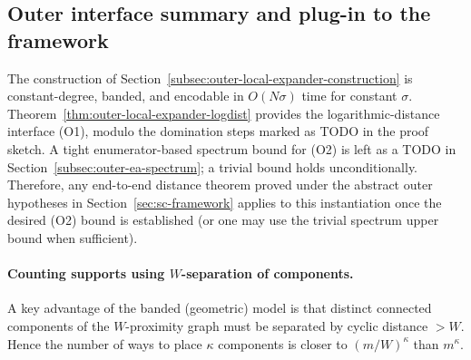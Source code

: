 \subsection{Outer interface summary and plug-in to the framework}
\label{subsec:outer-local-expander-plug}

The construction of Section~\ref{subsec:outer-local-expander-construction} is constant-degree, banded, and encodable in
$O(N\sigma)$ time for constant $\sigma$.
Theorem~\ref{thm:outer-local-expander-logdist} provides the logarithmic-distance interface (O1), modulo the domination
steps marked as TODO in the proof sketch.
A tight enumerator-based spectrum bound for (O2) is left as a TODO in
Section~\ref{subsec:outer-ea-spectrum}; a trivial bound holds unconditionally.
Therefore, any end-to-end distance theorem proved under the abstract outer hypotheses in
Section~\ref{sec:sc-framework} applies to this instantiation once the desired (O2) bound is established
(or one may use the trivial spectrum upper bound when sufficient).






%
%

\paragraph{Counting supports using $W$-separation of components.}
A key advantage of the banded (geometric) model is that distinct connected components of the $W$-proximity graph must be
separated by cyclic distance $>W$.
Hence the number of ways to place $\kappa$ components is closer to $(m/W)^\kappa$ than $m^\kappa$.

